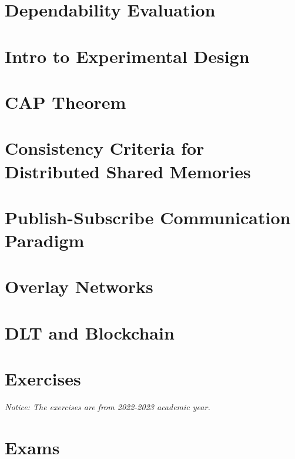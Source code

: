 	\newpage
	\section{Dependability Evaluation}
	
	\newpage
	\section{Intro to Experimental Design}
	
	\newpage
	\section{CAP Theorem}
	
	\newpage
	\section{Consistency Criteria for Distributed Shared Memories}
	
	\newpage
	\section{Publish-Subscribe Communication Paradigm}
	
	\newpage
	\section{Overlay Networks}
	
	\newpage
	\section{DLT and Blockchain}
		
	\newpage
	\section{Exercises}
	\emph{Notice: The exercises are from 2022-2023 academic year.}
	
	\newpage
	\section{Exams}

	
